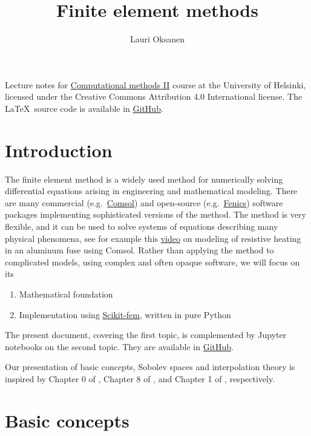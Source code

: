 \documentclass[12pt,oneside]{amsart}
\title{Finite element methods}
\author{Lauri Oksanen}
\begin{document}
\maketitle

\noindent
Lecture notes for
\href{https://studies.helsinki.fi/courses/cu/hy-CU-141575726-2020-08-01}{Computational methods II} course at the University of Helsinki, licensed under the Creative Commons Attribution 4.0 International license.
The \LaTeX\ source code is available in \href{https://github.com/uh-comp-methods2/lectures}{GitHub}.

\tableofcontents

\section{Introduction}

The finite element method is a widely used method for numerically solving differential equations arising in engineering and mathematical modeling. There are many commercial (e.g.~\href{https://en.wikipedia.org/wiki/COMSOL_Multiphysics}{Comsol}) and open-source (e.g.~\href{https://en.wikipedia.org/wiki/FEniCS_Project}{Fenics}) software packages implementing sophisticated versions of the method. The method is very flexible, and it can be used to solve systems of equations describing many physical phenomena, see for example this \href{https://www.comsol.com/video/joule-heating-fuse-circuit-board-chapter-1}{video} on modeling of resistive heating in an aluminum fuse using Comsol. Rather than applying the method to complicated models, using complex and often opaque software, we will focus on its

\begin{enumerate}[1. ]
\item Mathematical foundation
\item Implementation using \href{https://scikit-fem.readthedocs.io/en/latest/}{Scikit-fem}, written in pure Python 
\end{enumerate}

The present document, covering the first topic, is complemented by Jupyter notebooks on the second topic. They are available in 
\href{https://github.com/uh-comp-methods2/notebooks}{GitHub}.

Our presentation of basic concepts, Sobolev spaces and interpolation theory is inspired by Chapter 0 of \cite{BS}, Chapter 8 of \cite{Brezis}, and Chapter 1 of \cite{EG}, respectively. 

\section{Basic concepts}
\end{document}
